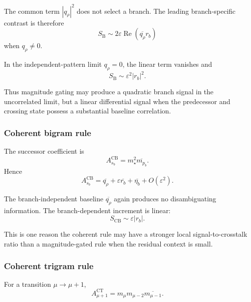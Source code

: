 The common term $|q_\rho|^2$ does not select a branch.  The leading
branch-specific contrast is therefore
\begin{equation}
S_{\mathrm{B}}
\sim
2\varepsilon
\operatorname{Re}
\left(
\overline{q_\rho}r_b
\right)
\end{equation}
when $q_\rho\neq0$.

In the independent-pattern limit $q_\rho=0$, the linear term vanishes and
\begin{equation}
S_{\mathrm{B}}
\sim
\varepsilon^2|r_b|^2.
\label{eq:bigram-independent-signal}
\end{equation}

Thus magnitude gating may produce a quadratic branch signal in the
uncorrelated limit, but a linear differential signal when the predecessor and
crossing state possess a substantial baseline correlation.

\subsubsection{Coherent bigram rule}

The successor coefficient is
\begin{equation}
A_{s_b}^{\mathrm{CB}}
=
m_\star^2\overline{m_{p_b}}.
\end{equation}
Hence
\begin{equation}
A_{s_b}^{\mathrm{CB}}
=
\overline{q_\rho}
+
\varepsilon\overline{r_b}
+
\overline{\eta_b}
+
O(\varepsilon^2).
\label{eq:coherent-bigram-expansion}
\end{equation}

The branch-independent baseline $\overline{q_\rho}$ again produces no
disambiguating information.  The branch-dependent increment is linear:
\begin{equation}
S_{\mathrm{CB}}
\sim
\varepsilon |r_b|.
\label{eq:coherent-bigram-signal}
\end{equation}

This is one reason the coherent rule may have a stronger local
signal-to-crosstalk ratio than a magnitude-gated rule when the residual context
is small.

\subsubsection{Coherent trigram rule}

For a transition $\mu\rightarrow\mu+1$,
\begin{equation}
A_{\mu+1}^{\mathrm{CT}}
=
m_\mu m_{\mu-2}\overline{m_{\mu-1}}.
\end{equation}

